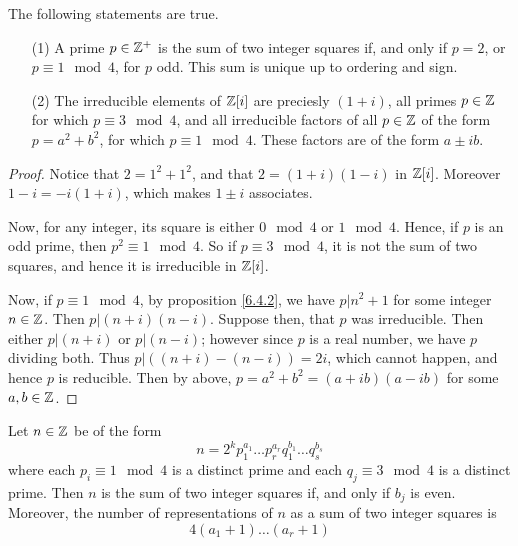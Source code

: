 \begin{theorem}\label{proposition_6.4.4}
  The following statements are true.
  \begin{enumerate}
    \item[(1)] A prime $p \in \mathbb{Z}^+$ is the sum of two integer squares if,
      and only if  $p=2$, or  $p \equiv 1 \mod{4}$, for $p$ odd. This sum
      is unique up to ordering and sign.

    \item[(2)] The irreducible elements of $\mathbb{Z}[i]$ are preciesly $(1+i)$,
      all primes $p \in \mathbb{Z}$ for which  $p \equiv 3 \mod{4}$, and all
      irreducible factors of all $p \in \mathbb{Z}$ of the form $p=a^2+b^2$, for
      which  $p \equiv 1 \mod{4}$. These factors are of the form $a \pm
      ib$.
  \end{enumerate}
\end{theorem}
\begin{proof}
  Notice that $2=1^2+1^2$, and that  $2=(1+i)(1-i)$ in $\mathbb{Z}[i]$. Moreover
  $1-i=-i(1+i)$, which makes $1 \pm i$ associates.

  Now, for any integer, its square is either $0 \mod{4}$ or $1 \mod{4}$.
  Hence, if $p$ is an odd prime, then $p^2 \equiv 1 \mod{4}$. So if $p \equiv
  3 \mod{4}$, it is not the sum of two squares, and hence it is irreducible in
  $\mathbb{Z}[i]$.

  Now, if $p \equiv 1 \mod{4}$, by proposition \ref{6.4.2}, we have $p|n^2+1$ for
  some integer  $n \in \mathbb{Z}$. Then  $p|(n+i)(n-i)$. Suppose then, that $p$ was
  irreducible. Then either $p|(n+i)$ or $p|(n-i)$; however since $p$ is a real
  number, we have $p$ dividing both. Thus $p|((n+i)-(n-i))=2i$, which cannot
  happen, and hence $p$ is reducible. Then by above, $p=a^2+b^2=(a+ib)(a-ib)$
  for some $a,b \in \mathbb{Z}$.
\end{proof}
\begin{corollary}
  Let $n \in \mathbb{Z}$ be of the form
  \begin{equation*}
    n=2^kp_1^{a_1} \dots p_r^{a_r}q_1^{b_1} \dots q_s^{b_s}
  \end{equation*}
  where each $p_i \equiv 1 \mod{4}$ is a distinct prime and each $q_j \equiv 3
  \mod{4}$ is a distinct prime. Then $n$ is the sum of two integer squares if,
  and only if $b_j$ is even. Moreover, the number of representations of $n$ as
  a sum of two integer squares is
  \begin{equation*}
    4(a_1+1) \dots (a_r+1)
  \end{equation*}
\end{corollary}
